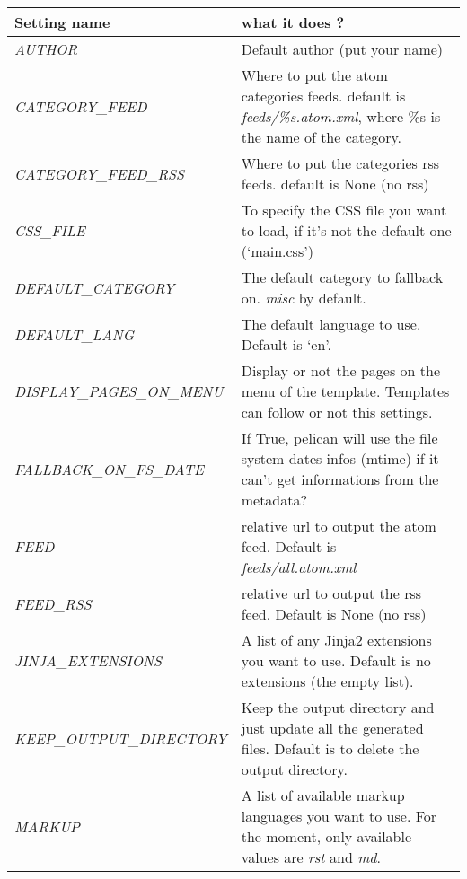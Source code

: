 \documentclass[letterpaper,10pt,english]{manual}
\begin{document}
\begin{tabulary}{\textwidth}{|L|L|}
\hline
\textbf{
Setting name
} & \textbf{
what it does ?
}\\
\hline

\emph{AUTHOR}
 & 
Default author (put your name)
\\

\emph{CATEGORY\_FEED}
 & 
Where to put the atom categories feeds. default is
\emph{feeds/\%s.atom.xml}, where \%s is the name of the
category.
\\

\emph{CATEGORY\_FEED\_RSS}
 & 
Where to put the categories rss feeds. default is None
(no rss)
\\

\emph{CSS\_FILE}
 & 
To specify the CSS file you want to load, if it's not
the default one (`main.css')
\\

\emph{DEFAULT\_CATEGORY}
 & 
The default category to fallback on. \emph{misc} by default.
\\

\emph{DEFAULT\_LANG}
 & 
The default language to use. Default is `en'.
\\

\emph{DISPLAY\_PAGES\_ON\_MENU}
 & 
Display or not the pages on the menu of the template.
Templates can follow or not this settings.
\\

\emph{FALLBACK\_ON\_FS\_DATE}
 & 
If True, pelican will use the file system dates infos
(mtime) if it can't get informations from the
metadata?
\\

\emph{FEED}
 & 
relative url to output the atom feed. Default is
\emph{feeds/all.atom.xml}
\\

\emph{FEED\_RSS}
 & 
relative url to output the rss feed. Default is
None (no rss)
\\

\emph{JINJA\_EXTENSIONS}
 & 
A list of any Jinja2 extensions you want to use.
Default is no extensions (the empty list).
\\

\emph{KEEP\_OUTPUT\_DIRECTORY}
 & 
Keep the output directory and just update all the generated files.
Default is to delete the output directory.
\\

\emph{MARKUP}
 & 
A list of available markup languages you want to use.
For the moment, only available values are \emph{rst} and \emph{md}.
\\


\end{tabulary}
\end{document}
